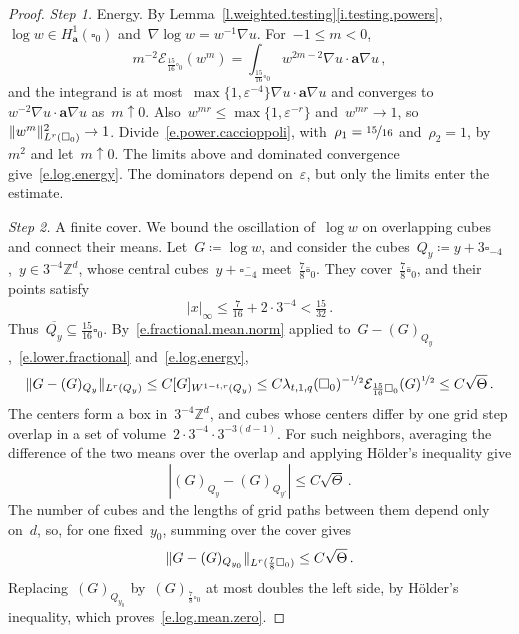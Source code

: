 \documentclass[11pt,letterpaper]{article}
\numberwithin{equation}{section}
\theoremstyle{definition}
\newcommand{\Zd}{\mathbb{Z}^d}
\renewcommand{\a}{\mathbf{a}}
\newcommand{\eps}{\varepsilon}
\newcommand{\nf}{\nicefrac}
\newcommand{\cu}{\square}
\DeclarePairedDelimiter{\norm}{\lVert}{\rVert}
\renewcommand{\subset}{\subseteq}
\newcommand{\Ener}{\mathcal E}
\begin{document}
\begin{proof}
\emph{Step 1.} Energy. By Lemma~\ref{l.weighted.testing}\ref{i.testing.powers},~$\log w\in H^1_\a(\cu_0)$ and~$\nabla\log w=w^{-1}\nabla u$. For~$-1\leq m<0$,
\begin{equation*}
	m^{-2}\Ener_{\frac{15}{16}\cu_0}(w^m)=\int_{\frac{15}{16}\cu_0}w^{2m-2}\nabla u\cdot\a\nabla u\,,
\end{equation*}
and the integrand is at most~$\max\{1,\eps^{-4}\}\nabla u\cdot\a\nabla u$ and converges to~$w^{-2}\nabla u\cdot\a\nabla u$ as~$m\uparrow0$. Also~$w^{mr}\leq\max\{1,\eps^{-r}\}$ and~$w^{mr}\to1$, so~$\norm{w^m}_{L^r(\cu_0)}^2\to1$. Divide~\eqref{e.power.caccioppoli}, with~$\rho_1=\nf{15}{16}$ and~$\rho_2=1$, by~$m^2$ and let~$m\uparrow0$. The limits above and dominated convergence give~\eqref{e.log.energy}. The dominators depend on~$\eps$, but only the limits enter the estimate.

\smallskip

\emph{Step 2.} A finite cover. We bound the oscillation of~$\log w$ on overlapping cubes and connect their means. Let~$G\coloneqq\log w$, and consider the cubes~$Q_y\coloneqq y+3\cu_{-4}$,~$y\in3^{-4}\Zd$, whose central cubes~$y+\overline{\cu_{-4}}$ meet~$\frac78\overline{\cu}_0$. They cover~$\frac78\overline{\cu}_0$, and their points satisfy
\begin{equation*}
	|x|_\infty\leq\tfrac7{16}+2\cdot3^{-4}<\tfrac{15}{32}\,.
\end{equation*}
Thus~$\overline{Q_y}\subset\frac{15}{16}\cu_0$. By~\eqref{e.fractional.mean.norm} applied to~$G-(G)_{Q_y}$,~\eqref{e.lower.fractional} and~\eqref{e.log.energy},
\begin{equation*}
	\norm{G-(G)_{Q_y}}_{L^r(Q_y)}\leq C[G]_{W^{1-t,r}(Q_y)}\leq C\lambda_{t,1,q}(\cu_0)^{-\nf12}\Ener_{\frac{15}{16}\cu_0}(G)^{\nf12}\leq C\sqrt\Theta\,.
\end{equation*}
The centers form a box in~$3^{-4}\Zd$, and cubes whose centers differ by one grid step overlap in a set of volume~$2\cdot3^{-4}\cdot3^{-3(d-1)}$. For such neighbors, averaging the difference of the two means over the overlap and applying H\"older's inequality give
\begin{equation*}
	|(G)_{Q_y}-(G)_{Q_{y'}}|\leq C\sqrt\Theta\,.
\end{equation*}
The number of cubes and the lengths of grid paths between them depend only on~$d$, so, for one fixed~$y_0$, summing over the cover gives
\begin{equation*}
	\norm{G-(G)_{Q_{y_0}}}_{L^r(\frac78\cu_0)}\leq C\sqrt\Theta\,.
\end{equation*} Replacing~$(G)_{Q_{y_0}}$ by~$(G)_{\frac78\cu_0}$ at most doubles the left side, by H\"older's inequality, which proves~\eqref{e.log.mean.zero}.
\end{proof}
\end{document}
